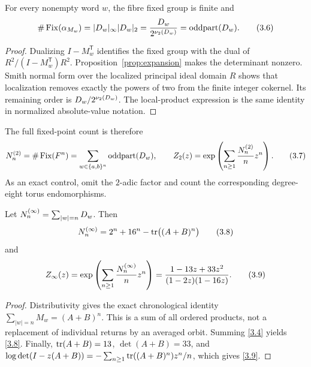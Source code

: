 \begin{theorem}
\label{thm:index}
For every nonempty word \(w\), the fibre fixed group is finite and
\[
 \#\operatorname{Fix}(\alpha_{M_w})
 =|D_w|_\infty |D_w|_2
 =\frac{D_w}{2^{\nu_2(D_w)}}
 =\operatorname{oddpart}(D_w).
 \tag{3.6}\label{3.6}
\]
\end{theorem}

\begin{proof}
Dualizing \(I-M_w^{\mathsf T}\) identifies the fixed group with the dual of
\(R^2/(I-M_w^{\mathsf T})R^2\).  Proposition~\ref{prop:expansion} makes the
determinant nonzero.  Smith normal form over the localized principal ideal
domain \(R\) shows that localization removes exactly the powers of two from
the finite integer cokernel.  Its remaining order is
\(D_w/2^{\nu_2(D_w)}\).  The local-product expression is the same identity in
normalized absolute-value notation.
\end{proof}

The full fixed-point count is therefore
\[
 N^{(2)}_n=\#\operatorname{Fix}(F^n)
 =\sum_{w\in\{a,b\}^n}\operatorname{oddpart}(D_w),
 \qquad
 Z_{2}(z)=\exp\left(\sum_{n\ge1}\frac{N^{(2)}_n}{n}z^n\right).
 \tag{3.7}\label{3.7}
\]
As an exact control, omit the \(2\)-adic factor and count the corresponding
degree-eight torus endomorphisms.

\begin{proposition}
\label{prop:arch}
Let \(N^{(\infty)}_n=\sum_{|w|=n}D_w\).  Then
\[
 N^{(\infty)}_n=2^n+16^n-\operatorname{tr}\bigl((A+B)^n\bigr)
 \tag{3.8}\label{3.8}
\]
and
\[
 Z_{\infty}(z)
 =\exp\left(\sum_{n\ge1}\frac{N^{(\infty)}_n}{n}z^n\right)
 =\frac{1-13z+33z^2}{(1-2z)(1-16z)}.
 \tag{3.9}\label{3.9}
\]
\end{proposition}

\begin{proof}
Distributivity gives the exact chronological identity
\(\sum_{|w|=n}M_w=(A+B)^n\).  This is a sum of all ordered products, not a
replacement of individual returns by an averaged orbit.  Summing
\eqref{3.4} yields \eqref{3.8}.  Finally,
\(\operatorname{tr}(A+B)=13\), \(\det(A+B)=33\), and
\(\log\det(I-z(A+B))=-\sum_{n\ge1}\operatorname{tr}((A+B)^n)z^n/n\), which gives
\eqref{3.9}.
\end{proof}
